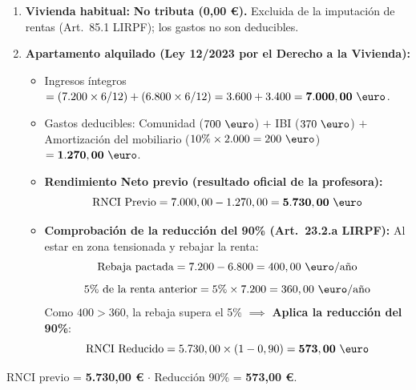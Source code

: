 \documentclass[11pt,a4paper,openany]{article}
\begin{document}
\begin{solucionBox}
\begin{enumerate}[label=\alph*.]
    \item \textbf{Vivienda habitual:} \textbf{No tributa (0,00 \euro).} Excluida de la imputación de rentas (Art.~85.1 LIRPF); los gastos no son deducibles.
    
    \item \textbf{Apartamento alquilado (Ley 12/2023 por el Derecho a la Vivienda):}
    \begin{itemize}
        \item Ingresos íntegros $= (7.200 \times 6/12) + (6.800 \times 6/12) = 3.600 + 3.400 = \mathbf{7.000,00\text{ \euro}}$.
        \item Gastos deducibles: Comunidad ($700\text{ \euro}$) $+$ IBI ($370\text{ \euro}$) $+$ Amortización del mobiliario ($10\% \times 2.000 = 200\text{ \euro}$) $= \mathbf{1.270,00\text{ \euro}}$.
        \item \textbf{Rendimiento Neto previo (resultado oficial de la profesora):}
        $$\text{RNCI Previo} = 7.000,00 - 1.270,00 = \mathbf{5.730,00\text{ \euro}}$$
        \item \textbf{Comprobación de la reducción del 90\% (Art.~23.2.a LIRPF):}
        Al estar en zona tensionada y rebajar la renta:
        $$\text{Rebaja pactada} = 7.200 - 6.800 = 400,00\text{ \euro/año}$$
        $$\text{5\% de la renta anterior} = 5\% \times 7.200 = 360,00\text{ \euro/año}$$
        Como $400 > 360$, la rebaja supera el 5\% $\implies$ \textbf{Aplica la reducción del 90\%}:
        $$\mathbf{\text{RNCI Reducido}} = 5.730,00 \times (1 - 0,90) = \mathbf{573,00\text{ \euro}}$$
    \end{itemize}
\end{enumerate}
\end{solucionBox}

\begin{resultadoBox}
RNCI previo = \textbf{5.730,00 \euro} $\cdot$ Reducción 90\% = \textbf{573,00 \euro}.
\end{resultadoBox}
\end{document}
